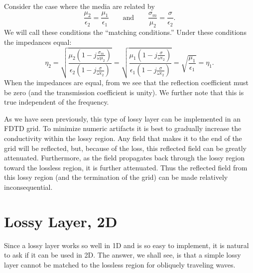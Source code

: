 Consider the case where the media are related by
\begin{equation}
  \frac{\mu_2}{\epsilon_2} = \frac{\mu_1}{\epsilon_1} 
  \qquad \mbox{and} \qquad
  \frac{\sigma_m}{\mu_2} = \frac{\sigma}{\epsilon_2}.
\end{equation}
We will call these conditions the ``matching conditions.''  Under
these conditions the impedances equal: 
\begin{equation}
  \eta_2=\sqrt{\frac{\mu_2\left(1-j\frac{\sigma_m}{\omega\mu_2}\right)}
             {\epsilon_2\left(1-j\frac{\sigma}{\omega\epsilon_2}\right)}}
  = \sqrt{\frac{\mu_1\left(1-j\frac{\sigma}{\omega\epsilon_2}\right)}
             {\epsilon_1\left(1-j\frac{\sigma}{\omega\epsilon_2}\right)}}
  = \sqrt{\frac{\mu_1}{\epsilon_1}} = \eta_1.
\end{equation}
When the impedances are equal, from  we see that
the reflection coefficient must be zero (and the transmission
coefficient is unity).  We further note that this is true independent
of the frequency.

As we have seen previously, this type of lossy layer can be
implemented in an FDTD grid.  To minimize numeric artifacts it is best
to gradually increase the conductivity within the lossy region.  Any
field that makes it to the end of the grid will be reflected, but,
because of the loss, this reflected field can be greatly attenuated.
Furthermore, as the field propagates back through the lossy region
toward the lossless region, it is further attenuated.  Thus the
reflected field from this lossy region (and the termination of the
grid) can be made relatively inconsequential.

\section{Lossy Layer, 2D}

Since a lossy layer works so well in 1D and is so easy to implement,
it is natural to ask if it can be used in 2D.  The answer, we shall
see, is that a simple lossy layer cannot be matched to the lossless
region for obliquely traveling waves.

